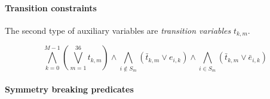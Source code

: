 \documentclass[]{llncs}
\begin{document}
\paragraph{Transition constraints} The second type of auxiliary variables are {\em transition variables} $t_{k,m}$.


\begin{equation}
\bigwedge_{k=0}^{M-1} (\bigvee_{m=1}^{36} t_{k,m}) \land \bigwedge_{i \notin S_m} (\bar t_{k,m} \lor e_{i,k}) \land \bigwedge_{i \in S_m} (\bar t_{k,m} \lor \bar e_{i,k})
\end{equation}



\paragraph{Symmetry breaking predicates}
\end{document}
